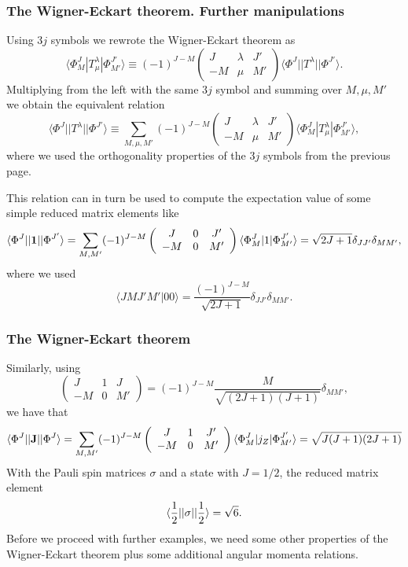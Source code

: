 \documentclass[compress]{beamer}
\begin{document}
\frame
{
\frametitle{The Wigner-Eckart theorem. Further manipulations}
\begin{small}
{\scriptsize
Using $3j$ symbols we rewrote the Wigner-Eckart theorem as
\[
\langle \Phi^J_M|T^{\lambda}_{\mu}|\Phi^{J'}_{M'}\rangle\equiv(-1)^{J-M}\left(\begin{array}{ccc}  J & \lambda & J' \\ -M & \mu & M'\end{array}\right)\langle \Phi^J||T^{\lambda}||\Phi^{J'}\rangle.
\]
Multiplying from the left with the same $3j$ symbol and summing over $M,\mu,M'$ we obtain the equivalent relation 
\[
\langle \Phi^J||T^{\lambda}||\Phi^{J'}\rangle\equiv\sum_{M,\mu,M'}(-1)^{J-M}\left(\begin{array}{ccc}  J & \lambda & J' \\ -M & \mu & M'\end{array}\right)\langle \Phi^J_M|T^{\lambda}_{\mu}|\Phi^{J'}_{M'}\rangle,
\]
where we used the orthogonality properties of the $3j$ symbols from the previous page.

This relation can in turn be used to compute the expectation value of some simple reduced matrix elements like
\[
\langle \Phi^J||{\bf 1}||\Phi^{J'}\rangle=\sum_{M,M'}(-1)^{J-M}\left(\begin{array}{ccc}  J & 0 & J' \\ -M & 0 & M'\end{array}\right)\langle \Phi^J_M|1|\Phi^{J'}_{M'}\rangle=\sqrt{2J+1}\delta_{JJ'}\delta_{MM'},
\]
where we used
\[
\langle JM J'M' |00\rangle =\frac{(-1)^{J-M}}{\sqrt{2J+1}}\delta_{JJ'}\delta_{MM'}.
\] 
}
\end{small}

}



\frame
{
\frametitle{The Wigner-Eckart theorem}
\begin{small}
{\scriptsize
Similarly, using 
\[
\left(\begin{array}{ccc}  J & 1 & J \\ -M & 0 & M'\end{array}\right)=(-1)^{J-M}\frac{M}{\sqrt{(2J+1)(J+1)}}\delta_{MM'},
\]
we have that 
\[
\langle \Phi^J||{\bf J}||\Phi^{J}\rangle=\sum_{M,M'}(-1)^{J-M}\left(\begin{array}{ccc}  J & 1 & J' \\ -M & 0 & M'\end{array}\right)\langle \Phi^J_M|j_Z|\Phi^{J'}_{M'}\rangle=\sqrt{J(J+1)(2J+1)}
\]
With the Pauli spin matrices $\sigma$ and a state with $J=1/2$, the reduced matrix element
\[
\langle \frac{1}{2}||{\bf \sigma}||\frac{1}{2}\rangle=\sqrt{6}.
\] 
Before we proceed with further examples, we need some other properties of the Wigner-Eckart theorem plus some additional angular momenta relations.
}
\end{small}

}
\end{document}
